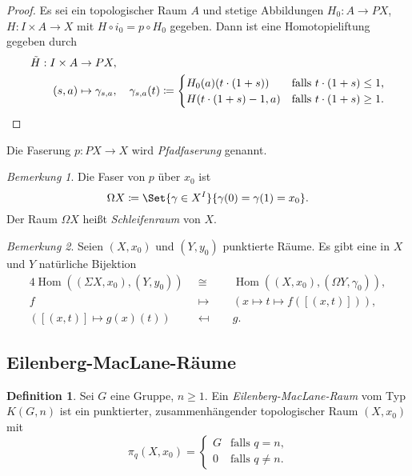 \documentclass[11pt, a4paper, german]{article}
\theoremstyle{definition}
\newtheorem*{defn}{Definition}
\theoremstyle{remark}
\newtheorem*{bem}{Bemerkung}
\DeclareMathOperator{\Hom}{Hom} %
\newcommand{\I}{I} %
\begin{document}
\begin{proof}
  Es sei ein topologischer Raum $A$ und stetige Abbildungen $H_0 : A \to PX$, $H : \I \times A \to X$ mit $H \circ i_0 = p \circ H_0$ gegeben.
  Dann ist eine Homotopieliftung gegeben durch
  \begin{align*}
    \tilde{H} : \I \times A & \to PX, \\
    (s, a) & \mapsto \gamma_{s, a}, \quad
    \gamma_{s, a}(t) \coloneqq \begin{cases}
      H_0(a)(t \cdot (1+s)) & \text{falls $t \cdot (1+s) \leq 1$,} \\
      H(t \cdot (1+s) - 1, a) & \text{falls $t \cdot (1+s) \geq 1$.}
      \qedhere
    \end{cases}
  \end{align*}
\end{proof}

Die Faserung $p : PX \to X$ wird \emph{Pfadfaserung} genannt.

\begin{bem}
  Die Faser von $p$ über $x_0$ ist
  \[ \Omega X \coloneqq \Set{\gamma \in X^\I}{\gamma(0) = \gamma(1) = x_0}. \]
  Der Raum $\Omega X$ heißt \emph{Schleifenraum} von $X$.
\end{bem}


\begin{bem}
  Seien $(X, x_0)$ und $(Y, y_0)$ punktierte Räume.
  Es gibt eine in $X$ und $Y$ natürliche Bijektion
  \begin{alignat*}{4}
    \Hom((\Sigma X, x_0), (Y, y_0)) & \enspace\cong\enspace && \Hom((X, x_0), (\Omega Y, \gamma_0)), \\
    f & \enspace\mapsto\enspace && (x \mapsto t \mapsto f([(x, t)])), \\
    ([(x, t)] \mapsto g(x)(t)) & \enspace\mapsfrom\enspace && g.
  \end{alignat*}
\end{bem}

\subsection{Eilenberg-MacLane-Räume}

\begin{defn}
  Sei $G$ eine Gruppe, $n \geq 1$.
  Ein \emph{Eilenberg-MacLane-Raum} vom Typ $K(G, n)$ ist ein punktierter, zusammenhängender topologischer Raum $(X, x_0)$ mit
  \[
    \pi_q(X, x_0) = \begin{cases}
      G & \text{falls $q = n$,} \\
      0 & \text{falls $q \neq n$.}
    \end{cases}
  \]
\end{defn}
\end{document}
